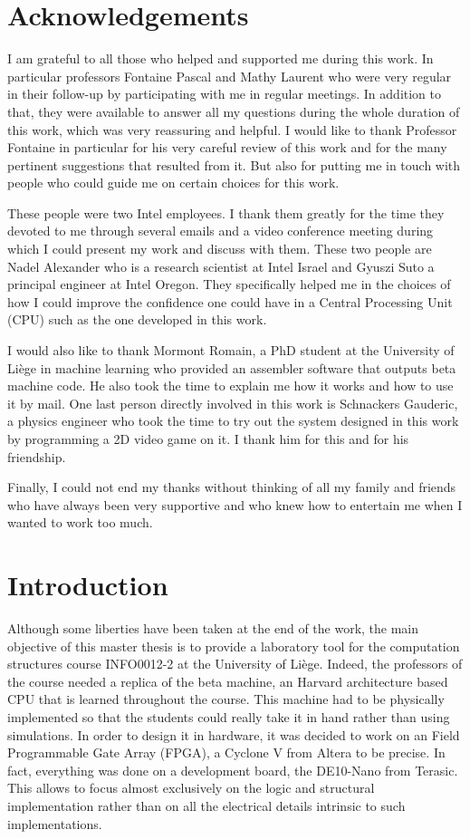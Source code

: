 \chapter*{Acknowledgements}

I am grateful to all those who helped and supported me during this work. In particular professors 
Fontaine Pascal and Mathy Laurent who were very regular in their follow-up by participating with me 
in regular meetings. In addition to that, they were available to answer all my questions during the 
whole duration of this work, which was very reassuring and helpful. I would like to thank Professor 
Fontaine in particular for his very careful review of this work and for the many pertinent 
suggestions that resulted from it. But also for putting me in touch with people who could guide me 
on certain choices for this work.

These people were two Intel employees. I thank them greatly for the time they devoted to me through 
several emails and a video conference meeting during which I could present my work and discuss with 
them. These two people are Nadel Alexander who is a research scientist at Intel Israel and Gyuszi 
Suto a principal engineer at Intel Oregon. They specifically helped me in the choices of how I could 
improve the confidence one could have in a Central Processing Unit (CPU) such as the one developed in this work.

I would also like to thank Mormont Romain, a PhD student at the University of Liège in machine learning
who provided an assembler software that outputs beta machine code. He also took 
the time to explain me how it works and how to use it by mail. One last person directly involved in 
this work is Schnackers Gauderic, a physics engineer who took the time to try out the system 
designed in this work by programming a 2D video game on it. I thank him for this and for his friendship.

Finally, I could not end my thanks without thinking of all my family and friends who have always been 
very supportive and who knew how to entertain me when I wanted to work too much.

\chapter*{Introduction}

Although some liberties have been taken at the end of the work, the main objective of this master thesis
is to provide a laboratory tool for the computation structures course INFO0012-2 at the University of Liège. Indeed, the professors of 
the course needed a replica of the beta machine, an Harvard architecture based CPU that is learned
throughout the course. This machine had to be physically implemented so that the students could 
really take it in hand rather than using simulations. In order to design it in hardware, it was 
decided to work on an Field Programmable Gate Array (FPGA), a Cyclone V from Altera to be precise. In fact, everything was done on a 
development board, the DE10-Nano from Terasic. This allows to focus almost exclusively on the logic and 
structural implementation rather than on all the electrical details intrinsic to such 
implementations.


